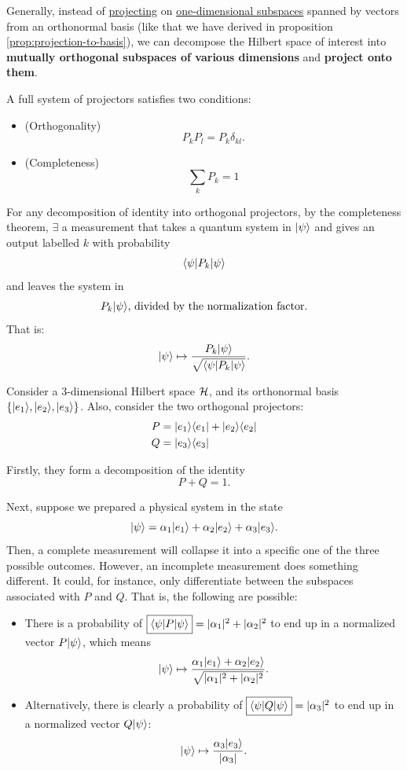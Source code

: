 \documentclass[12pt]{article}
\begin{document}
\begin{remark}
Generally, instead of \underline{projecting} on \underline{one-dimensional subspaces} spanned by vectors from an orthonormal basis (like that we have derived in proposition \ref{prop:projection-to-basis}), we can decompose the Hilbert space of interest into \textbf{mutually orthogonal subspaces of various dimensions} and \textbf{project onto them}.
\end{remark}

\noindent A full system of projectors satisfies two conditions:
\begin{itemize}
    \item (Orthogonality) $$
    P_kP_l = P_k\delta_{kl}.
    $$
    \item (Completeness) $$
    \underset{k}{\sum}P_k = 1
    $$
\end{itemize}

\noindent For any decomposition of identity into orthogonal projectors, by the completeness theorem, $\exists$ a measurement that takes a quantum system in $\Ket{\psi}$ and gives an output labelled $k$ with probability $$
\Bra{\psi} P_k\Ket{\psi}
$$ and leaves the system in $$
P_k\Ket{\psi}\text{, divided by the normalization factor.}
$$ That is: $$
\Ket{\psi} \mapsto \frac{P_k\Ket{\psi}}{\sqrt{\Bra{\psi} P_k\Ket{\psi}}}.
$$

\begin{example}
Consider a $3$-dimensional Hilbert space $\HHH$, and its orthonormal basis $\{\Ket{e_1}, \Ket{e_2}, \Ket{e_3}\}$. Also, consider the two orthogonal projectors: $$
\begin{aligned}
P &= \Ket{e_1}\Bra{e_1} + \Ket{e_2}\Bra{e_2}\\
Q &= \Ket{e_3}\Bra{e_3}
\end{aligned}
$$

\noindent Firstly, they form a decomposition of the identity $$
P + Q = 1.
$$

\noindent Next, suppose we prepared a physical system in the state $$
\Ket{\psi} = \alpha_1 \Ket{e_1} + \alpha_2 \Ket{e_2} + \alpha_3 \Ket{e_3}.
$$ Then, a complete measurement will collapse it into a specific one of the three possible outcomes. However, an incomplete measurement does something different. It could, for instance, only differentiate between the subspaces associated with $P$ and $Q$. That is, the following are possible:
\begin{itemize}
    \item There is a probability of $\boxed{\Bra{\psi}P\Ket{\psi}} = |\alpha_1|^2 + |\alpha_2|^2$ to end up in a normalized vector $P\Ket{\psi}$, which means $$
    \Ket{\psi} \mapsto \frac{\alpha_1\Ket{e_1} + \alpha_2\Ket{e_2}}{\sqrt{|\alpha_1|^2 + |\alpha_2|^2}}.
    $$
    \item Alternatively, there is clearly a probability of $\boxed{\Bra{\psi}Q\Ket{\psi}} = |\alpha_3|^2$ to end up in a normalized vector $Q\Ket{\psi}$: $$
    \Ket{\psi} \mapsto \frac{\alpha_3\Ket{e_3}}{|\alpha_3|}.
    $$
\end{itemize}
\end{example}
\end{document}
